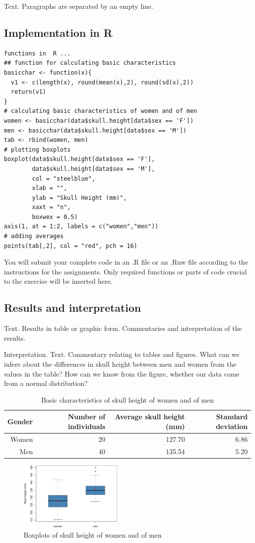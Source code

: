 Text. Paragraphs are separated by an empty line. 

\subsection*{Implementation in R}
\begin{lstlisting}
functions in  R ...
## function for calculating basic characteristics
basicchar <- function(x){
  v1 <- c(length(x), round(mean(x),2), round(sd(x),2))
  return(v1)
}
# calculating basic characteristics of women and of men
women <- basicchar(data$skull.height[data$sex == 'F'])
men <- basicchar(data$skull.height[data$sex == 'M'])
tab <- rbind(women, men)
# plotting boxplots
boxplot(data$skull.height[data$sex == 'F'], 
        data$skull.height[data$sex == 'M'],
        col = "steelblue", 
        xlab = "",
        ylab = "Skull Height (mm)",
        xaxt = "n", 
        boxwex = 0.5)
axis(1, at = 1:2, labels = c("women","men"))
# adding averages
points(tab[,2], col = "red", pch = 16)
\end{lstlisting}

You will submit your complete code in an \textsf{.R} file or an \textsf{.Rnw} file according to the instructions for the assignments. Only required functions or parts of code crucial to the exercise will be inserted here.
\bigskip
\subsection*{Results and interpretation}
\noindent Text. Results in table or graphic form. Commentaries and interpretation of the results.

 Interpretation. Text. Commentary relating to tables and figures. What can we infere about the differences in skull height between men and women from the values in the table? How can we know from the figure, whether our data come from a normal distribution?

\begin{table}[ht]
\footnotesize
\centering

\begin{tabular}{r||rrr}
 Gender & Number of individuals & Average skull height (mm) & Standard deviation \\ 
 \hline \hline
Women & 20 & 127.70 & 6.86 \\ 
Men & 40 & 135.54 & 5.20 \\ 
\end{tabular}
\caption{Basic characteristics of skull height of women and of men}
\end{table}


\begin{figure}[ht]
\centering
\includegraphics[angle=0,width=0.45\textwidth]{boxplot-example.pdf}
\caption{Boxplots of skull height of women and of men}
\end{figure}